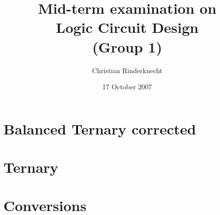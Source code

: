 \documentclass[11pt,a4paper]{article}
\title{Mid-term examination on\\ Logic Circuit Design\\ (Group 1)}
\author{Christian Rinderknecht}
\date{17 October 2007}
\begin{document}
\maketitle
\thispagestyle{empty}

\allowdisplaybreaks

\section{Balanced Ternary corrected}




\section{Ternary}



\section{Conversions}


\end{document}
